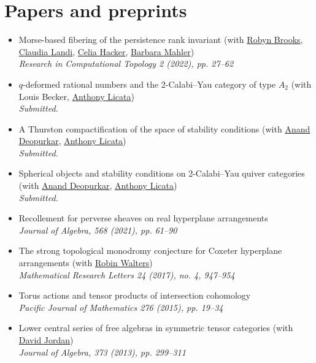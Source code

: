 \documentclass[a4paper]{moderncv}
\begin{document}
\section{Papers and preprints}
\label{sec:orgf2b9299}
\begin{itemize}
\item Morse-based fibering of the persistence rank invariant (with \href{https://sites.google.com/view/robynkayebrooks/home}{Robyn Brooks}, \href{http://personale.unimore.it/Rubrica/Dettaglio/clandi}{Claudia Landi}, \href{https://people.epfl.ch/celia.hacker/?lang=en}{Celia Hacker}, \href{https://www.maths.ox.ac.uk/people/barbara.mahler}{Barbara Mahler})\\
\emph{Research in Computational Topology 2 (2022), pp. 27--62}
\item \(q\)-deformed rational numbers and the 2-Calabi--Yau category of type \(A_{2}\) (with Louis Becker, \href{https://maths-people.anu.edu.au/\~licatat/Home.html}{Anthony Licata})\\
\emph{Submitted.}
\item A Thurston compactification of the space of stability conditions (with \href{https://deopurkar.github.io}{Anand Deopurkar}, \href{https://maths-people.anu.edu.au/\~licatat/Home.html}{Anthony Licata})\\
\emph{Submitted.}
\item Spherical objects and stability conditions on 2-Calabi--Yau quiver categories (with \href{https://deopurkar.github.io}{Anand Deopurkar}, \href{https://maths-people.anu.edu.au/\~licatat/Home.html}{Anthony Licata})\\
\emph{Submitted.}
\item Recollement for perverse sheaves on real hyperplane arrangements\\
\emph{Journal of Algebra, 568 (2021), pp. 61--90}
\item The strong topological monodromy conjecture for Coxeter hyperplane arrangements (with \href{http://mathserver.neu.edu/\~robin/}{Robin Walters})\\
\emph{Mathematical Research Letters 24 (2017), no. 4, 947--954}
\item Torus actions and tensor products of intersection cohomology\\
\emph{Pacific Journal of Mathematics 276 (2015), pp. 19--34}
\item Lower central series of free algebras in symmetric tensor categories (with \href{http://www.maths.ed.ac.uk/\~djordan/}{David Jordan})\\
\emph{Journal of Algebra, 373 (2013), pp. 299--311}
\end{itemize}
\end{document}
